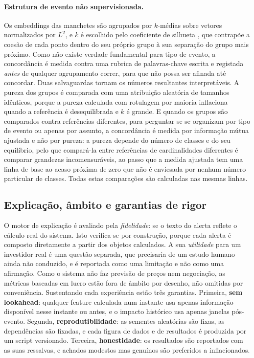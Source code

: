 \paragraph{Estrutura de evento não supervisionada.} Os embeddings das manchetes são agrupados por
$k$-médias sobre vetores normalizados por $L^2$, e $k$ é escolhido pelo coeficiente de silhueta
\autocite{rousseeuw1987silhouettes}, que contrapõe a coesão de cada ponto dentro do seu próprio grupo
à sua separação do grupo mais próximo. Como não existe verdade fundamental para tipo de evento, a
concordância é medida contra uma rubrica de palavras-chave escrita e registada \emph{antes} de
qualquer agrupamento correr, para que não possa ser afinada até concordar. Duas salvaguardas tornam
os números resultantes interpretáveis. A pureza dos grupos é comparada com uma atribuição aleatória
de tamanhos idênticos, porque a pureza calculada com rotulagem por maioria inflaciona quando a
referência é desequilibrada e $k$ é grande. E quando os grupos são comparados contra referências
diferentes, para perguntar se se organizam por tipo de evento ou apenas por assunto, a concordância é
medida por informação mútua ajustada \autocite{vinh2010ami} e não por pureza: a pureza depende do
número de classes e do seu equilíbrio, pelo que compará-la entre referências de cardinalidades
diferentes é comparar grandezas incomensuráveis, ao passo que a medida ajustada tem uma linha de base
ao acaso próxima de zero que não é enviesada por nenhum número particular de classes. Todas estas comparações são calculadas nas mesmas linhas.

\subsection{Explicação, âmbito e garantias de rigor}
\label{sec:met_eval_rigour}

O motor de explicação é avaliado pela \emph{fidelidade}: se o texto do alerta reflete o cálculo real do
sistema. Isto verifica-se por construção, porque cada alerta é composto diretamente a partir dos objetos
calculados. A sua \emph{utilidade} para um investidor real é uma questão separada, que precisaria de um
estudo humano ainda não conduzido, e é reportada como uma limitação e não como uma afirmação. Como o sistema
não faz previsão de preços nem negociação, as métricas baseadas em lucro estão fora de âmbito por desenho,
não omitidas por conveniência. Sustentando cada experiência estão três garantias. Primeira, \textbf{sem
lookahead}: qualquer feature calculada num instante usa apenas informação disponível nesse instante ou
antes, e o impacto histórico usa apenas janelas pós-evento. Segunda, \textbf{reprodutibilidade}: as sementes
aleatórias são fixas, as dependências são fixadas, e cada figura de dados e de resultados é produzida por um
script versionado. Terceira, \textbf{honestidade}: os resultados são reportados com as suas ressalvas, e
achados modestos mas genuínos são preferidos a inflacionados.

